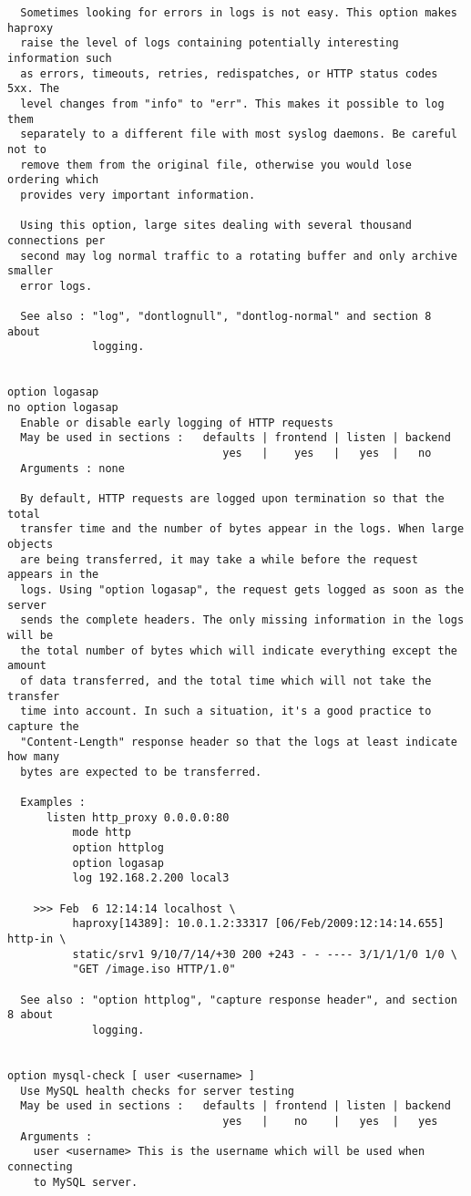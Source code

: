 \begin{verbatim}
  Sometimes looking for errors in logs is not easy. This option makes haproxy
  raise the level of logs containing potentially interesting information such
  as errors, timeouts, retries, redispatches, or HTTP status codes 5xx. The
  level changes from "info" to "err". This makes it possible to log them
  separately to a different file with most syslog daemons. Be careful not to
  remove them from the original file, otherwise you would lose ordering which
  provides very important information.

  Using this option, large sites dealing with several thousand connections per
  second may log normal traffic to a rotating buffer and only archive smaller
  error logs.

  See also : "log", "dontlognull", "dontlog-normal" and section 8 about
             logging.


option logasap
no option logasap
  Enable or disable early logging of HTTP requests
  May be used in sections :   defaults | frontend | listen | backend
                                 yes   |    yes   |   yes  |   no
  Arguments : none

  By default, HTTP requests are logged upon termination so that the total
  transfer time and the number of bytes appear in the logs. When large objects
  are being transferred, it may take a while before the request appears in the
  logs. Using "option logasap", the request gets logged as soon as the server
  sends the complete headers. The only missing information in the logs will be
  the total number of bytes which will indicate everything except the amount
  of data transferred, and the total time which will not take the transfer
  time into account. In such a situation, it's a good practice to capture the
  "Content-Length" response header so that the logs at least indicate how many
  bytes are expected to be transferred.

  Examples :
      listen http_proxy 0.0.0.0:80
          mode http
          option httplog
          option logasap
          log 192.168.2.200 local3

    >>> Feb  6 12:14:14 localhost \
          haproxy[14389]: 10.0.1.2:33317 [06/Feb/2009:12:14:14.655] http-in \
          static/srv1 9/10/7/14/+30 200 +243 - - ---- 3/1/1/1/0 1/0 \
          "GET /image.iso HTTP/1.0"

  See also : "option httplog", "capture response header", and section 8 about
             logging.


option mysql-check [ user <username> ]
  Use MySQL health checks for server testing
  May be used in sections :   defaults | frontend | listen | backend
                                 yes   |    no    |   yes  |   yes
  Arguments :
    user <username> This is the username which will be used when connecting
    to MySQL server.


\end{verbatim}
